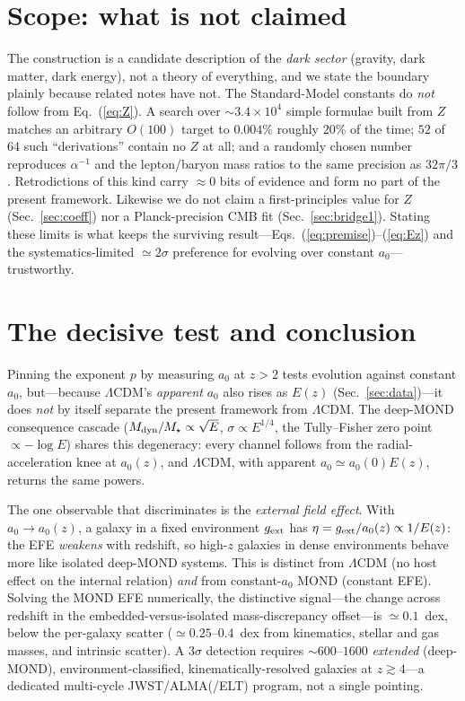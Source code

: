 \documentclass[aps,prd,preprint,nofootinbib,floatfix]{revtex4-2}
\begin{document}
\section{Scope: what is not claimed}
\label{sec:scope}
The construction is a candidate description of the {\it dark sector}
(gravity, dark matter, dark energy), not a theory of everything, and we state the
boundary plainly because related notes have not. The Standard-Model constants do
{\it not} follow from Eq.~(\ref{eq:Z}). A search over $\sim3.4\times10^4$ simple
formulae built from $Z$ matches an arbitrary $O(100)$ target to $0.004\%$ roughly
$20\%$ of the time; $52$ of $64$ such ``derivations'' contain no $Z$ at all; and a
randomly chosen number reproduces $\alpha^{-1}$ and the lepton/baryon mass ratios
to the same precision as $32\pi/3$. Retrodictions of this kind carry $\approx0$
bits of evidence and form no part of the present framework. Likewise we do not
claim a first-principles value for $Z$ (Sec.~\ref{sec:coeff}) nor a
Planck-precision CMB fit (Sec.~\ref{sec:bridge1}). Stating these limits is what
keeps the surviving result---Eqs.~(\ref{eq:premise})--(\ref{eq:Ez}) and the
systematics-limited $\simeq2\sigma$ preference for evolving over constant
$a_0$---trustworthy.

\section{The decisive test and conclusion}
Pinning the exponent $p$ by measuring $a_0$ at $z>2$ tests evolution against
constant $a_0$, but---because $\Lambda$CDM's {\it apparent} $a_0$ also rises as
$E(z)$ (Sec.~\ref{sec:data})---it does {\it not} by itself separate the present
framework from $\Lambda$CDM. The deep-MOND consequence cascade
($M_{\rm dyn}/M_\star\propto\sqrt{E}$, $\sigma\propto E^{1/4}$, the Tully--Fisher
zero point $\propto-\log E$) shares this degeneracy: every channel follows from the
radial-acceleration knee at $a_0(z)$, and $\Lambda$CDM, with apparent
$a_0\simeq a_0(0)E(z)$, returns the same powers.

The one observable that discriminates is the {\it external field effect}. With
$a_0\to a_0(z)$, a galaxy in a fixed environment $g_{\rm ext}$ has
$\eta=g_{\rm ext}/a_0(z)\propto1/E(z)$: the EFE {\it weakens} with redshift, so
high-$z$ galaxies in dense environments behave more like isolated deep-MOND systems.
This is distinct from $\Lambda$CDM (no host effect on the internal relation) {\it and}
from constant-$a_0$ MOND (constant EFE). Solving the MOND EFE numerically, the
distinctive signal---the change across redshift in the embedded-versus-isolated
mass-discrepancy offset---is $\simeq0.1$~dex, below the per-galaxy scatter
($\simeq0.25$--$0.4$~dex from kinematics, stellar and gas masses, and intrinsic
scatter). A $3\sigma$ detection requires $\sim600$--$1600$ {\it extended} (deep-MOND),
environment-classified, kinematically-resolved galaxies at $z\gtrsim4$---a dedicated
multi-cycle JWST/ALMA(/ELT) program, not a single pointing.
\end{document}
